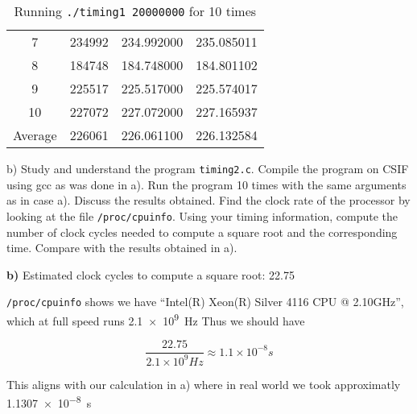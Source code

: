 \documentclass{article}
\begin{document}
\begin{description}
\begin{table}[H]
\begin{tabular}{SSSS}
			      7                               & 234992                         & 234.992000                                       & 235.085011                                        \\
			      8                               & 184748                         & 184.748000                                       & 184.801102                                        \\
			      9                               & 225517                         & 225.517000                                       & 225.574017                                        \\
			      10                              & 227072                         & 227.072000                                       & 227.165937                                        \\
			      \midrule
			      {Average}                       & 226061                         & 226.061100                                       & 226.132584                                        \\
			      \bottomrule
		      \end{tabular}
		      \caption{Running \lstinline{./timing1 20000000} for 10 times}
	      \end{table}

	      b) Study and understand the program \lstinline{timing2.c}.
	      Compile the program on CSIF using gcc as was done in a). Run the program 10 times
	      with the same arguments as in case a). Discuss the results obtained. Find the clock rate
	      of the processor by looking at the file \lstinline{/proc/cpuinfo}. Using your timing information,
	      compute the number of clock cycles needed to compute a square root and the corresponding time. Compare with the results obtained in a).

	      \textbf{b)}
	      Estimated clock cycles to compute a square root: 22.75

	      \lstinline{/proc/cpuinfo} shows we have ``Intel(R) Xeon(R) Silver 4116 CPU @ 2.10GHz'', which at full speed runs \SI{2.1e9}{\hertz}
	      Thus we should have

	      $$ \frac{22.75}{2.1 \times 10^9 Hz} \approx  1.1 \times 10^{-8} s$$

	      This aligns with our calculation in a) where in real world we took approximatly \SI{1.1307e-8}{\second}


\end{description}
\end{document}
